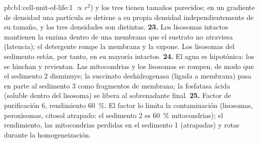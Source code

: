 \begin{solution}{pb:b1:cell-unit-of-life:1}
$\propto r^2$) y los tres  tienen tamaños parecidos; en un
gradiente de densidad una partícula se detiene a su propia densidad
independientemente de su tamaño, y las tres densidades son distintas.
\textbf{23.} Los lisosomas intactos mantienen la enzima dentro de una
membrana que el sustrato no atraviesa (latencia); el detergente rompe la
membrana y la expone. Los lisosomas del sedimento están, por tanto, en su
mayoría intactos.
\textbf{24.} El agua es hipotónica: los  se hinchan y revientan.
Las mitocondrias y los lisosomas se rompen, de modo que el sedimento 2
disminuye; la succinato deshidrogenasa (ligada a membrana) pasa en parte al
sedimento 3 como fragmentos de membrana; la fosfatasa ácida (soluble dentro
del lisosoma) se libera al sobrenadante final.
\textbf{25.} Factor de purificación $6$, rendimiento \qty{60}{\%}. El factor
lo limita la contaminación (lisosomas, peroxisomas, citosol atrapado: el
sedimento 2 es \qty{60}{\%} mitocondrias); el rendimiento, las mitocondrias
perdidas en el sedimento 1 (atrapadas) y rotas durante la homogeneización.
\end{solution}
